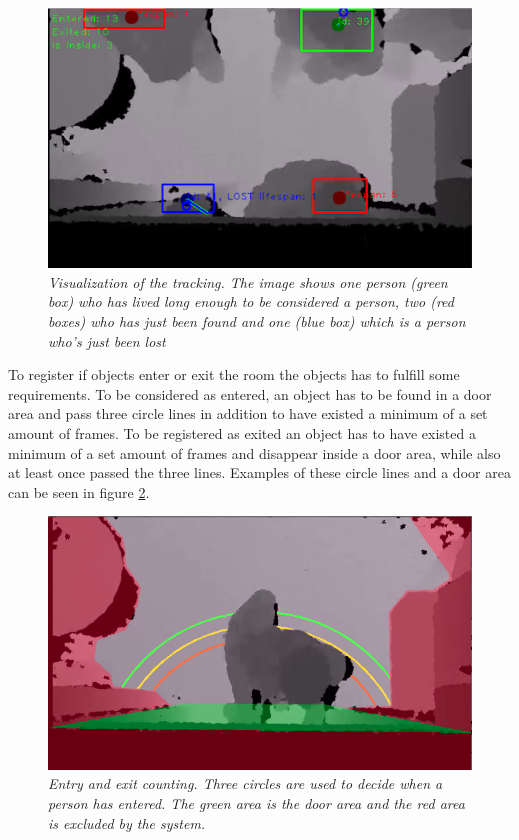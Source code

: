 \begin{figure}[htb]
	\centering
	\includegraphics[width=0.7\linewidth]{images/trackingexample2.png}
	\caption[Entry exit circles]{\textit{Visualization of the tracking. The image shows one person (green box) who has lived long enough to be considered a person, two (red boxes) who has just been found and one (blue box) which is a person who’s just been lost}}
	\label{fig:trackingexample}  %
\end{figure}


To register if objects enter or exit the room the objects has to fulfill some requirements. To be considered as entered, an object has to be found in a door area and pass three circle lines in addition to have existed a minimum of a set amount of frames. To be registered as exited an object has to have existed a minimum of a set amount of frames and disappear inside a door area, while also at least once passed the three lines. Examples of these circle lines and a door area can be seen in figure \ref{fig:entry_exit}.

\begin{figure}[htb]
	\centering
	\includegraphics[width=0.7\linewidth]{images/entryexitexample.png}
	\caption[Entry exit circles]{\textit{Entry and exit counting. Three circles are used to decide when a person has entered. The green area is the door area and the red area is excluded by the system.}}
	\label{fig:entry_exit}  %
\end{figure}

